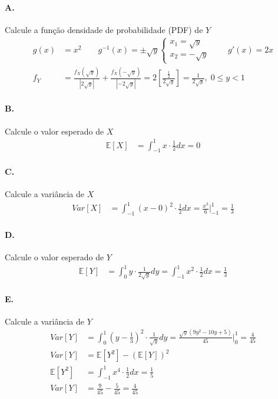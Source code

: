 \documentclass{article}
\begin{document}
\paragraph*{A.} Calcule a função densidade de probabilidade (PDF) de $Y$
\begin{align*}
    g(x) &= x^2 \qquad g^{-1}(x) = \pm \sqrt{y}
    \begin{cases}
        x_1 = \sqrt{y} \\
        x_2 = -\sqrt{y}
    \end{cases} \qquad g'(x) = 2x \\
    f_Y &= \frac{f_X(\sqrt{y})}{|2\sqrt{y}|} + \frac{f_X(-\sqrt{y})}{|-2\sqrt{y}|} = 2 \left[
        \frac{\frac{1}{2}}{2\sqrt{y} }\right] = \frac{1}{2\sqrt{y}}, \; 0 \le y < 1
\end{align*}

\paragraph*{B.} Calcule o valor esperado de $X$
\begin{align*}
    \mathbb{E}[X] &= \int_{-1}^1 x \cdot \frac{1}{2} dx = 0
\end{align*}

\paragraph*{C.} Calcule a variância de $X$
\begin{align*}
    Var[X] &= \int_{-1}^1 (x-0)^2 \cdot \frac{1}{2} dx = \frac{x^3}{6} \bigg\rvert_{-1}^{1} =
    \frac{1}{3}
\end{align*}

\paragraph*{D.} Calcule o valor esperado de $Y$
\begin{align*}
    \mathbb{E}[Y] &= \int_0^1 y \cdot \frac{1}{2\sqrt{y} } dy = \int_{-1}^1 x^2 \cdot \frac{1}{2} dx = \frac{1}{3}
\end{align*}

\paragraph*{E.} Calcule a variância de $Y$
\begin{align*}
    Var[Y] &= \int_0^1 (y-\frac{1}{3})^2 \cdot \frac{1}{\sqrt{y}} dy =
    \frac{\sqrt{y}(9y^2-10y+5)}{45} \bigg\rvert_{0}^{1} = \frac{4}{45} \\
    Var[Y] &= \mathbb{E}[Y^2] - (\mathbb{E}[Y])^2 \\
    \mathbb{E}[Y^2] &= \int_{-1}^1 x^4 \cdot \frac{1}{2} dx = \frac{1}{5} \\
    Var[Y] &= \frac{9}{45} - \frac{5}{45} = \frac{4}{45}
\end{align*}
\end{document}
